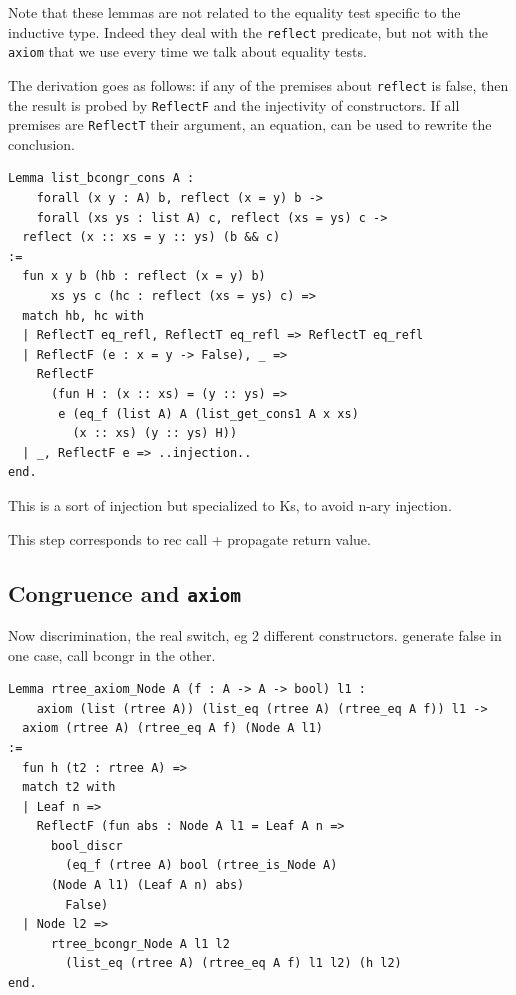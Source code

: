 \documentclass[sigplan,10pt,review]{acmart}\settopmatter{printfolios=true,printccs=false,printacmref=false}
\begin{document}
\noindent
Note that these lemmas are not related to the
equality test specific to the inductive type. Indeed they deal
with the \lstinline+reflect+ predicate, but not with the
\lstinline+axiom+ that we use every time we talk about equality tests.

The derivation goes as follows: if any of the premises about
\lstinline+reflect+ is false, then the result is probed by
\lstinline+ReflectF+ and the injectivity of constructors.
If all premises are \lstinline+ReflectT+ their argument,
an equation, can be used to rewrite the conclusion.

\begin{lstlisting}
Lemma list_bcongr_cons A :
    forall (x y : A) b, reflect (x = y) b ->
    forall (xs ys : list A) c, reflect (xs = ys) c ->
  reflect (x :: xs = y :: ys) (b && c)
:=
  fun x y b (hb : reflect (x = y) b)
      xs ys c (hc : reflect (xs = ys) c) =>
  match hb, hc with
  | ReflectT eq_refl, ReflectT eq_refl => ReflectT eq_refl
  | ReflectF (e : x = y -> False), _ =>
    ReflectF
      (fun H : (x :: xs) = (y :: ys) =>
       e (eq_f (list A) A (list_get_cons1 A x xs)
         (x :: xs) (y :: ys) H))
  | _, ReflectF e => ..injection..
end.
\end{lstlisting}

This is a sort of injection but specialized to Ks, to avoid n-ary
injection.

This step corresponds to rec call + propagate return value.

\subsection{Congruence and \lstinline+axiom+} %

Now discrimination, the real switch, eg 2 different constructors.
generate false in one case, call bcongr in the other.

\begin{lstlisting}
Lemma rtree_axiom_Node A (f : A -> A -> bool) l1 :
    axiom (list (rtree A)) (list_eq (rtree A) (rtree_eq A f)) l1 ->
  axiom (rtree A) (rtree_eq A f) (Node A l1)
:=
  fun h (t2 : rtree A) =>
  match t2 with
  | Leaf n =>
    ReflectF (fun abs : Node A l1 = Leaf A n =>
      bool_discr
        (eq_f (rtree A) bool (rtree_is_Node A)
	  (Node A l1) (Leaf A n) abs)
        False)
  | Node l2 =>
      rtree_bcongr_Node A l1 l2
        (list_eq (rtree A) (rtree_eq A f) l1 l2) (h l2)
end.
\end{lstlisting}
\end{document}
